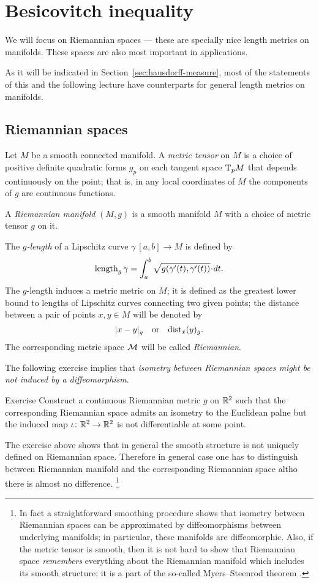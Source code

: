 \chapter{Besicovitch inequality} 

We will focus on Riemannian spaces --- these are specially nice length metrics on manifolds.
These spaces are also most important in applications.

As it will be indicated in Section~\ref{sec:hausdorff-measure},
most of the statements of this and the following lecture have counterparts for general length metrics on manifolds.

\section{Riemannian spaces}

Let $M$ be a smooth connected manifold.
A \emph{metric tensor} on $M$ is a choice of positive definite quadratic forms $g_p$ on each tangent space $\mathrm{T}_pM$ that depends continuously on the point;
that is, in any local coordinates of $M$ the components of $g$ are continuous functions.

A \emph{Riemannian manifold} $(M,g)$ is a smooth manifold $M$ with a choice of metric tensor $g$ on it.

The \emph{$g$-length} of a Lipschitz curve $\gamma\:[a,b]\to M$  is defined by
\[\length_g\gamma=\int_a^b\sqrt{g(\gamma'(t),\gamma'(t))}\cdot dt.\]
The $g$-length induces a metric metric on $M$; it is defined as the greatest lower bound to lengths of Lipschitz curves connecting two given points;
the distance between a pair of points $x,y\in M$ will be denoted by 
\[\dist{x}{y}{g}\quad\text{or}\quad\distfun_x(y)_g.\]
The corresponding metric space $\mathcal{M}$ will be called \emph{Riemannian}.

The following exercise implies that \textit{isometry between Riemannian spaces might be not induced by a diffeomorphism}.

\begin{thm}{Exercise}\label{ex:non-differentiable}
Construct a continuous Riemannian metric $g$ on $\mathbb{R}^2$ such that the corresponding Riemannian space admits an isometry to the Euclidean palne but the induced map $\iota\colon\mathbb{R}^2\to\mathbb{R}^2$ is not differentiable at some point.
\end{thm}

The exercise above shows that in general the smooth structure is not uniquely defined on Riemannian space.
Therefore in general case one has to distinguish between Riemannian manifold and the corresponding Riemannian space altho there is almost no difference.%
\footnote{In fact a straightforward smoothing procedure shows that isometry between Riemannian spaces can be approximated by diffeomorphisms between underlying manifolds; in particular, these manifolds are diffeomorphic.
Also, if the metric tensor is smooth, then it is not hard to show that Riemannian space {}\emph{remembers} everything about the Riemannian manifold which includes its smooth structure;
it is a part of the so-called Myers--Steenrod theorem \cite{myers-steenrod}.} 

